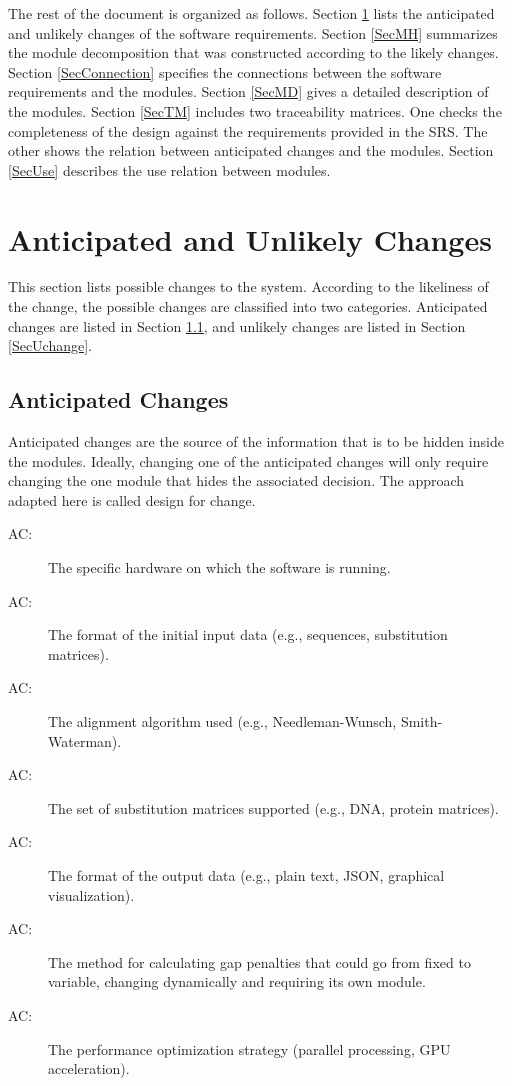 \documentclass[12pt, titlepage]{article}
\newcounter{acnum}
\newcommand{\actheacnum}{AC\theacnum}
\begin{document}
The rest of the document is organized as follows. Section
\ref{SecChange} lists the anticipated and unlikely changes of the software
requirements. Section \ref{SecMH} summarizes the module decomposition that
was constructed according to the likely changes. Section \ref{SecConnection}
specifies the connections between the software requirements and the
modules. Section \ref{SecMD} gives a detailed description of the
modules. Section \ref{SecTM} includes two traceability matrices. One checks
the completeness of the design against the requirements provided in the SRS. The
other shows the relation between anticipated changes and the modules. Section
\ref{SecUse} describes the use relation between modules.

\section{Anticipated and Unlikely Changes} \label{SecChange}

This section lists possible changes to the system. According to the likeliness
of the change, the possible changes are classified into two
categories. Anticipated changes are listed in Section \ref{SecAchange}, and
unlikely changes are listed in Section \ref{SecUchange}.

\subsection{Anticipated Changes} \label{SecAchange}

Anticipated changes are the source of the information that is to be hidden
inside the modules. Ideally, changing one of the anticipated changes will only
require changing the one module that hides the associated decision. The approach
adapted here is called design for
change.

\begin{description}
  \item[ \actheacnum \label{acHardware}:] The specific hardware on which the software is running.
  \item[ \actheacnum \label{acInput}:] The format of the initial input data (e.g., sequences, substitution matrices).
  \item[ \actheacnum \label{acAlgorithm}:] The alignment algorithm used (e.g., Needleman-Wunsch, Smith-Waterman).
  \item[ \actheacnum \label{acSubstitutionMatrices}:] The set of substitution matrices supported (e.g., DNA, protein matrices).
  \item[ \actheacnum \label{acOutput}:] The format of the output data (e.g., plain text, JSON, graphical visualization).
  \item[ \actheacnum \label{acGapPenalty}:] The method for calculating gap penalties that could go from fixed to variable, changing dynamically and requiring its own module.
  \item[ \actheacnum \label{acPerformance}:] The performance optimization strategy (parallel processing, GPU acceleration).
\end{description}
\end{document}
